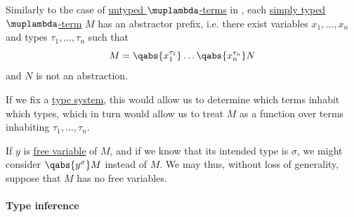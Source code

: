 \begin{remark}\label{rem:simply_typed_lambda_term_dependency}
  Similarly to the case of \hyperref[def:lambda_term]{untyped \( \muplambda \)-terms} in , each \hyperref[def:typed_lambda_term]{simply typed \( \muplambda \)-term} \( M \) has an abstractor prefix, i.e. there exist variables \( x_1, \ldots, x_n \) and types \( \tau_1, \ldots, \tau_n \) such that
  \begin{equation*}
    M = \qabs {x_1^{\tau_1}} \ldots \qabs {x_n^{\tau_n}} N
  \end{equation*}
  and \( N \) is not an abstraction.

  If we fix a \hyperref[def:abstract_type_system]{type system}, this would allow us to determine which terms inhabit which types, which in turn would allow us to treat \( M \) as a function over terms inhabiting \( \tau_1, \ldots, \tau_n \).

  If \( y \) is \hyperref[def:lambda_variable_freeness]{free variable} of \( M \), and if we know that its intended type is \( \sigma \), we might consider \( \qabs {y^\sigma} M \) instead of \( M \). We may thus, without loss of generality, suppose that \( M \) has no free variables.
\end{remark}

\paragraph{Type inference}


